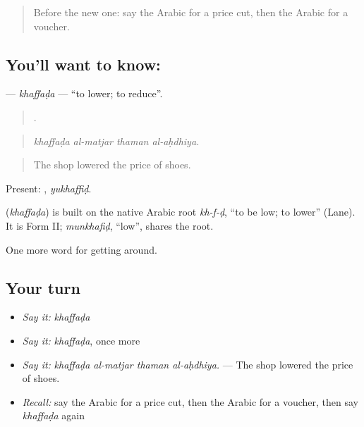 \label{lesson:AR-C457-khaffada}



\begin{quote}
Before the new one: say the Arabic for a price cut, then the Arabic for a voucher.
\end{quote}

\subsection*{You'll want to know: }
\textbf{} — \emph{khaffaḍa} — \textquotedblleft{}to lower; to reduce\textquotedblright{}.

\begin{quote}
   .
\end{quote}

\begin{quote}
\emph{khaffaḍa al-matjar thaman al-aḥdhiya.}
\end{quote}

\begin{quote}
The shop lowered the price of shoes.
\end{quote}

Present: , \emph{yukhaffiḍ}.

\begin{cousinweb}
\textbf{} (\emph{khaffaḍa}) is built on the native Arabic root \emph{kh-f-ḍ}, \textquotedblleft{}to be low; to lower\textquotedblright{} (Lane). It is Form II; \emph{munkhafiḍ}, \textquotedblleft{}low\textquotedblright{}, shares the root.
\end{cousinweb}

\begin{grammarlens}[title={What you've built}]
One more word for getting around.
\end{grammarlens}

\subsection*{Your turn}
\begin{itemize}
\raggedright
  \item \emph{Say it:} \emph{khaffaḍa}
  \item \emph{Say it:} \emph{khaffaḍa}, once more
  \item \emph{Say it:} \emph{khaffaḍa al-matjar thaman al-aḥdhiya.} — The shop lowered the price of shoes.
  \item \emph{Recall:} say the Arabic for a price cut, then the Arabic for a voucher, then say \emph{khaffaḍa} again
\end{itemize}


